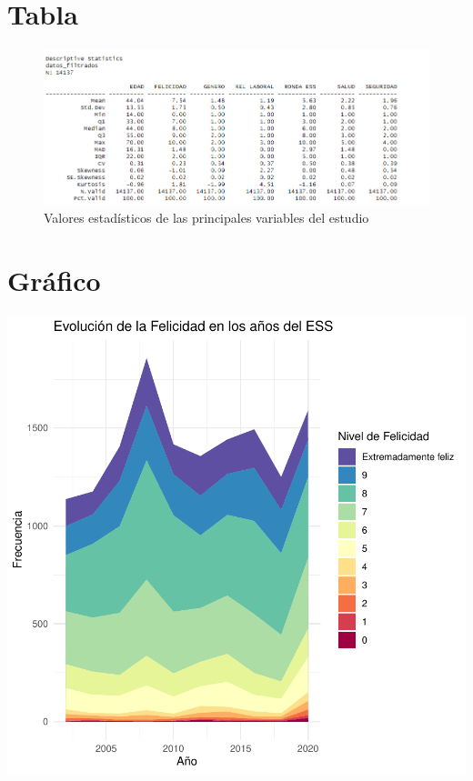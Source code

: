 \documentclass{report}
\begin{document}
\section*{Tabla}

\begin{figure}[h!]
\caption{Valores estadísticos de las principales variables del estudio}
\includegraphics[scale=0.8]{DATOS_FILTRADOS.png}
\end{figure}


\section*{Gráfico}






\includegraphics{Informe-grafico}
\end{document}
